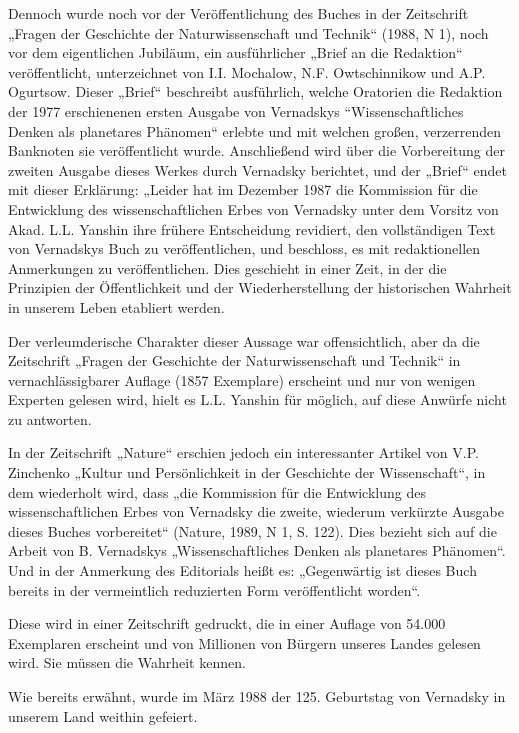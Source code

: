 \documentclass[11pt,a4paper]{article}
\begin{document}
Dennoch wurde noch vor der Veröffentlichung des Buches in der Zeitschrift
„Fragen der Geschichte der Naturwissenschaft und Technik“ (1988, N 1), noch
vor dem eigentlichen Jubiläum, ein ausführlicher „Brief an die Redaktion“
veröffentlicht, unterzeichnet von I.I. Mochalow, N.F. Owtschinnikow und
A.P. Ogurtsow. Dieser „Brief“ beschreibt ausführlich, welche Oratorien die
Redaktion der 1977 erschienenen ersten Ausgabe von Vernadskys
“Wissenschaftliches Denken als planetares Phänomen“ erlebte und mit welchen
großen, verzerrenden Banknoten sie veröffentlicht wurde. Anschließend wird
über die Vorbereitung der zweiten Ausgabe dieses Werkes durch Vernadsky
berichtet, und der „Brief“ endet mit dieser Erklärung: „Leider hat im Dezember
1987 die Kommission für die Entwicklung des wissenschaftlichen Erbes von
Vernadsky unter dem Vorsitz von Akad. L.L. Yanshin ihre frühere Entscheidung
revidiert, den vollständigen Text von Vernadskys Buch zu veröffentlichen, und
beschloss, es mit redaktionellen Anmerkungen zu veröffentlichen. Dies
geschieht in einer Zeit, in der die Prinzipien der Öffentlichkeit und der
Wiederherstellung der historischen Wahrheit in unserem Leben etabliert werden.

Der verleumderische Charakter dieser Aussage war offensichtlich, aber da die
Zeitschrift „Fragen der Geschichte der Naturwissenschaft und Technik“ in
vernachlässigbarer Auflage (1857 Exemplare) erscheint und nur von wenigen
Experten gelesen wird, hielt es L.L. Yanshin für möglich, auf diese Anwürfe
nicht zu antworten.

In der Zeitschrift „Nature“ erschien jedoch ein interessanter Artikel von
V.P. Zinchenko „Kultur und Persönlichkeit in der Geschichte der Wissenschaft“,
in dem wiederholt wird, dass „die Kommission für die Entwicklung des
wissenschaftlichen Erbes von Vernadsky die zweite, wiederum verkürzte Ausgabe
dieses Buches vorbereitet“ (Nature, 1989, N 1, S. 122). Dies bezieht sich auf
die Arbeit von B. Vernadskys „Wissenschaftliches Denken als planetares
Phänomen“. Und in der Anmerkung des Editorials heißt es: „Gegenwärtig ist
dieses Buch bereits in der vermeintlich reduzierten Form veröffentlicht
worden“.

Diese wird in einer Zeitschrift gedruckt, die in einer Auflage von 54.000
Exemplaren erscheint und von Millionen von Bürgern unseres Landes gelesen
wird. Sie müssen die Wahrheit kennen.

Wie bereits erwähnt, wurde im März 1988 der 125. Geburtstag von Vernadsky in
unserem Land weithin gefeiert.
\end{document}
